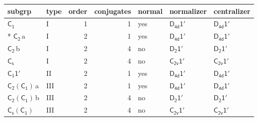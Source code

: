 \documentclass[10pt,a4paper]{article}
\numberwithin{equation}{section}
\newcommand{\grp}[1]{\mathsf{#1}}
\newcommand{\nconj}[1]{{\scriptsize$\times#1$}}
\newcommand{\clsletter}[1]{\,{\scriptsize\color{black!55}#1}}
\begin{document}
\begin{center}
\end{center}
{\small\begin{longtable}{@{}llrrlll@{}}\toprule
subgrp & type & order & conjugates & normal & normalizer & centralizer\\\midrule\endhead
\bottomrule\endfoot\endlastfoot
\href{../../../rotation/data/pdf/C1.pdf}{$\grp{C_{1}}$} & I & 1 & 1 & yes & \href{D4d-1p.pdf}{$\grp{D_{4d}1'}$} & \href{D4d-1p.pdf}{$\grp{D_{4d}1'}$}\\*
\href{../../../rotation/data/pdf/C2.pdf}{$\grp{C_{2}}$}\clsletter{a} & I & 2 & 1 & yes & \href{D4d-1p.pdf}{$\grp{D_{4d}1'}$} & \href{D4d-1p.pdf}{$\grp{D_{4d}1'}$}\\
\href{../../../rotation/data/pdf/C2.pdf}{$\grp{C_{2}}$}\clsletter{b} & I & 2 & 4 & no & \href{D2-1p.pdf}{$\grp{D_{2}1'}$} & \href{D2-1p.pdf}{$\grp{D_{2}1'}$}\\
\href{../../../rotation/data/pdf/C1v.pdf}{$\grp{C_{s}}$} & I & 2 & 4 & no & \href{C2v-1p.pdf}{$\grp{C_{2v}1'}$} & \href{C2v-1p.pdf}{$\grp{C_{2v}1'}$}\\
\href{C1-1p.pdf}{$\grp{C_{1}1'}$} & II & 2 & 1 & yes & \href{D4d-1p.pdf}{$\grp{D_{4d}1'}$} & \href{D4d-1p.pdf}{$\grp{D_{4d}1'}$}\\
\href{C2-C1.pdf}{$\grp{C_{2}}(\grp{C_{1}})$}\clsletter{a} & III & 2 & 1 & yes & \href{D4d-1p.pdf}{$\grp{D_{4d}1'}$} & \href{D4d-1p.pdf}{$\grp{D_{4d}1'}$}\\
\href{C2-C1.pdf}{$\grp{C_{2}}(\grp{C_{1}})$}\clsletter{b} & III & 2 & 4 & no & \href{D2-1p.pdf}{$\grp{D_{2}1'}$} & \href{D2-1p.pdf}{$\grp{D_{2}1'}$}\\
\href{C1v-C1.pdf}{$\grp{C_{s}}(\grp{C_{1}})$} & III & 2 & 4 & no & \href{C2v-1p.pdf}{$\grp{C_{2v}1'}$} & \href{C2v-1p.pdf}{$\grp{C_{2v}1'}$}\\

\end{longtable}}
\end{document}
